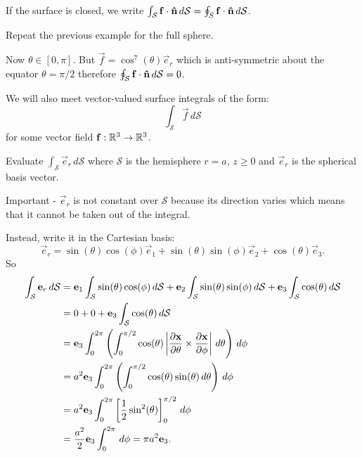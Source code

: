 \documentclass[10pt, a4paper]{article}
\begin{document}
If the surface is closed,
we write $\int_{\mathcal{S}}\vec{f}\cdot\hvec{n}\,d\mathcal{S} = \oint_{S}\vec{f}\cdot\hvec{n}\,d\mathcal{S}$.

\begin{example}
    Repeat the previous example for the full sphere.

    \begin{solution}
        Now $\theta \in [0, \pi]$.
        But $\vec{f} = \cos ^ 7(\theta)\vec{e}_r$ which is anti-symmetric about the equator $\theta = \pi / 2$ therefore $\oint_{\mathcal{S}}\vec{f}\cdot\hvec{n}\,d\mathcal{S} = 0$.
    \end{solution}
\end{example}

We will also meet vector-valued surface integrals of the form:
\[
\int_{\mathcal{S}}\vec{f}\,d\mathcal{S}
\]
for some vector field $\vec{f} : \R ^ 3 \to \R ^ 3$.

\begin{example}
    Evaluate $\int_{\mathcal{S}}\vec{e}_r\,d\mathcal{S}$ where $\mathcal{S}$ is the hemisphere $r = a$,
    $z \geq 0$ and $\vec{e}_r$ is the spherical basis vector.

    \begin{solution}
        Important -
        $\vec{e}_r$ is not constant over $\mathcal{S}$ because its direction varies which means that it cannot be taken out of the integral.

        Instead,
        write it in the Cartesian basis:
        \[
        \vec{e}_r = \sin(\theta)\cos(\phi)\vec{e}_1 + \sin(\theta)\sin(\phi)\vec{e}_2 + \cos(\theta)\vec{e}_3.
        \]
        So
        \begin{align*}
            \int_{\mathcal{S}}\vec{e}_r\,d\mathcal{S} &= \vec{e}_1\int_{\mathcal{S}}\sin(\theta)\cos(\phi)\,d\mathcal{S} + \vec{e}_2\int_{\mathcal{S}}\sin(\theta)\sin(\phi)\,d\mathcal{S} + \vec{e}_3\int_{\mathcal{S}}\cos(\theta)\,d\mathcal{S} \\
            &= 0 + 0 + \vec{e}_3\int_{\mathcal{S}}\cos(\theta)\,d\mathcal{S} \\
            &= \vec{e}_3\int_{0}^{2\pi}\left(\int_{0}^{\pi / 2}\cos(\theta)\left|\pd[\vec{x}]{\theta}\times\pd[\vec{x}]{\phi}\right|\,d\theta\right)\,d\phi \\
            &= a ^ 2\vec{e}_3\int_{0}^{2\pi}\left(\int_{0}^{\pi / 2}\cos(\theta)\sin(\theta)\,d\theta\right)\,d\phi \\
            &= a ^ 2\vec{e}_3\int_{0}^{2\pi}\left[\frac{1}{2}\sin ^ 2(\theta)\right]_{0}^{\pi / 2}\,d\phi \\
            &= \frac{a ^ 2}{2}\vec{e}_3\int_{0}^{2\pi}\,d\phi = \pi a ^ 2\vec{e}_3.
        \end{align*}
    \end{solution}
\end{example}
\end{document}
